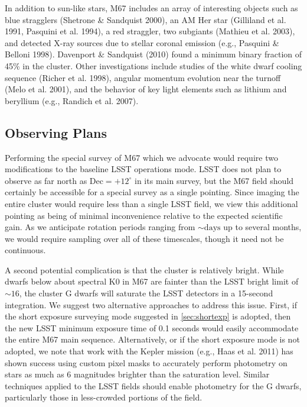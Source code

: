 In addition to sun-like stars, M67 includes an array of interesting
objects such as blue stragglers (Shetrone \& Sandquist 2000), an AM
Her star (Gilliland et al. 1991, Pasquini et al. 1994), a red straggler,
two subgiants (Mathieu et al. 2003), and detected X-ray sources due
to stellar coronal emission (e.g., Pasquini \& Belloni 1998). Davenport
\& Sandquist (2010) found a minimum binary fraction of 45\% in the
cluster. Other investigations include studies of the white dwarf cooling
sequence (Richer et al. 1998), angular momentum evolution near the
turnoff (Melo et al. 2001), and the behavior of key light elements
such as lithium and beryllium (e.g., Randich et al. 2007).


\subsection{Observing Plans }

Performing the special survey of M67 which we advocate would require
two modifications to the baseline LSST operations mode. LSST does
not plan to observe as far north as $\mathrm{Dec}=+12^{\circ}$ in
its main survey, but the M67 field should certainly be accessible
for a special survey as a single pointing. Since imaging the entire cluster
would require less than a single LSST field, we view this additional
pointing as being of minimal inconvenience relative to the expected
scientific gain. As we anticipate rotation periods ranging from $\sim\mathrm{days}$
up to several months, we would require sampling over all of these
timescales, though it need not be continuous.

A second potential complication is that the cluster is relatively
bright. While dwarfs below about spectral K0 in M67 are fainter than
the LSST bright limit of $\sim16$, the cluster G dwarfs will saturate
the LSST detectors in a 15-second integration. We suggest two alternative
approaches to address this issue. First, if the short exposure surveying mode
suggested in \autoref{sec:shortexp} is adopted,
then the new LSST minimum exposure time of 0.1 seconds would easily
accommodate the entire M67 main sequence. Alternatively, or if the
short exposure mode is not adopted, we note that work with the Kepler
mission (e.g., Haas et al. 2011) has shown success using custom pixel
masks to accurately perform photometry on stars as much as 6 magnitudes
brighter than the saturation level. Similar techniques applied to
the LSST fields should enable photometry for the G dwarfs, particularly
those in less-crowded portions of the field.

